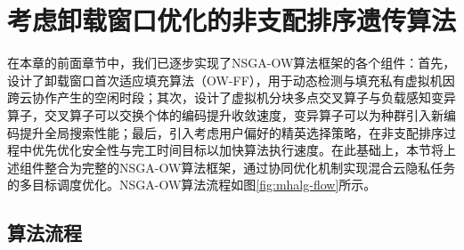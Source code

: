 

\section{考虑卸载窗口优化的非支配排序遗传算法}\label{sec:framework}


在本章的前面章节中，我们已逐步实现了NSGA-OW算法框架的各个组件：首先，设计了卸载窗口首次适应填充算法（OW-FF），用于动态检测与填充私有虚拟机因跨云协作产生的空闲时段；其次，设计了虚拟机分块多点交叉算子与负载感知变异算子，交叉算子可以交换个体的编码提升收敛速度，变异算子可以为种群引入新编码提升全局搜索性能；最后，引入考虑用户偏好的精英选择策略，在非支配排序过程中优先优化安全性与完工时间目标以加快算法执行速度。在此基础上，本节将上述组件整合为完整的NSGA-OW算法框架，通过协同优化机制实现混合云隐私任务的多目标调度优化。NSGA-OW算法流程如图\ref{fig:mhalg-flow}所示。

\subsection{算法流程}

